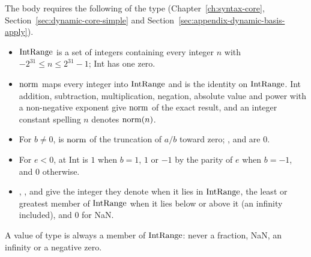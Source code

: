 The body requires the following of the type 
(Chapter~\ref{ch:syntax-core}, Section~\ref{sec:dynamic-core-simple} and
Section~\ref{sec:appendix-dynamic-basis-apply}).
\begin{itemize}
\item $\mathrm{IntRange}$ is a set of integers containing every integer $n$ with
  $-2^{31}\leq n\leq 2^{31}-1$; Int has one zero. %
\item $\mathrm{norm}$ maps every integer into $\mathrm{IntRange}$ and is the identity on
  $\mathrm{IntRange}$. Int addition, subtraction, multiplication, negation, absolute
  value and power with a non-negative exponent give $\mathrm{norm}$ of the exact
  result, and an integer constant spelling $n$ denotes $\mathrm{norm}(n)$. %
\item For $b\neq 0$,  is $\mathrm{norm}$ of the truncation of $a/b$ toward
  zero; ,  and  are $0$.
\item For $e<0$,  at Int is $1$ when $b=1$, $1$ or
  $-1$ by the parity of $e$ when $b=-1$, and $0$ otherwise. %
\item {}, ,  and  give the integer
  they denote when it lies in $\mathrm{IntRange}$, the least or greatest member of
  $\mathrm{IntRange}$ when it lies below or above it (an infinity included), and $0$
  for NaN. %
\end{itemize}
A value of type  is always a member of $\mathrm{IntRange}$: never a fraction,
NaN, an infinity or a negative zero.

